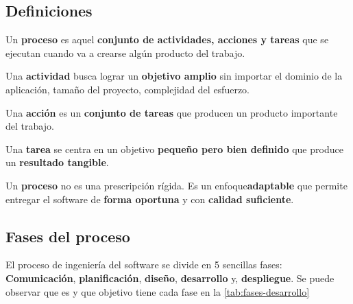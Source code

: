 \documentclass[a4paper,11pt]{report}
\begin{document}
    \subsection{Definiciones}\label{subsec:definiciones}
    \begin{definicion}
        Un \textbf{proceso} es aquel \textbf{conjunto de actividades, acciones y tareas} que se ejecutan cuando va a crearse algún producto del trabajo.
    \end{definicion}
    \begin{definicion}
        Una \textbf{actividad} busca lograr un \textbf{objetivo amplio} sin importar el dominio de la aplicación, tamaño del proyecto, complejidad del esfuerzo.
    \end{definicion}

    \begin{definicion}
        Una \textbf{acción} es un \textbf{conjunto de tareas} que producen un producto importante del trabajo.
    \end{definicion}
    \begin{definicion}
        Una \textbf{tarea} se centra en un objetivo \textbf{pequeño pero bien definido} que produce un \textbf{resultado tangible}.
    \end{definicion}
    \begin{definicion}
        Un \textbf{proceso} no es una prescripción rígida.
        Es un enfoque\textbf{adaptable} que permite entregar el software de \textbf{forma oportuna} y con \textbf{calidad suficiente}.
    \end{definicion}

    \subsection{Fases del proceso}\label{subsec:fases-del-proceso}
    El proceso de ingeniería del software se divide en 5 sencillas fases: \textbf{Comunicación}, \textbf{planificación}, \textbf{diseño}, \textbf{desarrollo} y, \textbf{despliegue}.
    Se puede observar que es y que objetivo tiene cada fase en la \autoref{tab:fases-desarrollo}
\end{document}
